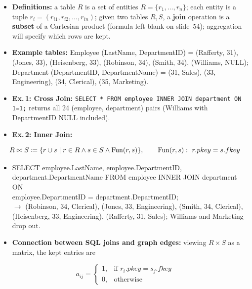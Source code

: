 \begin{itemize}
  \item \textbf{Definitions:} a table $R$ is a set of entities $R=\{r_1,\dots,r_n\}$;
    each entity is a tuple $r_i=(r_{i1},r_{i2},\dots,r_{in})$; given two tables $R,S$, a
    \textbf{join} operation is a \textbf{subset} of a Cartesian product (formula left blank
    on slide~54); aggregation will specify which rows are kept.
  \item \textbf{Example tables:} Employee (LastName, DepartmentID) = (Rafferty, 31),
    (Jones, 33), (Heisenberg, 33), (Robinson, 34), (Smith, 34), (Williams, NULL);
    Department (DepartmentID, DepartmentName) = (31, Sales), (33, Engineering),
    (34, Clerical), (35, Marketing).
  \item \textbf{Ex.\,1: Cross Join:} \texttt{SELECT * FROM employee INNER JOIN department
    ON 1=1;} returns all 24 (employee, department) pairs (Williams with DepartmentID
    NULL included).
  \item \textbf{Ex.\,2: Inner Join:}
\end{itemize}
\begin{equation}\label{eq:lec12-join}
  R\bowtie S\coloneqq\{r\cup s\mid r\in R\wedge s\in S\wedge \mathrm{Fun}(r,s)\},
  \qquad \mathrm{Fun}(r,s):\ r.pkey=s.fkey
\end{equation}
\begin{itemize}
  \item[] {\small\ttfamily SELECT employee.LastName, employee.DepartmentID,\\
    \hspace*{1em}department.DepartmentName FROM employee INNER JOIN department ON\\
    \hspace*{1em}employee.DepartmentID = department.DepartmentID;}\\
    $\to$ (Robinson, 34, Clerical), (Jones, 33, Engineering), (Smith, 34, Clerical),
    (Heisenberg, 33, Engineering), (Rafferty, 31, Sales); Williams and Marketing drop out.
  \item \textbf{Connection between SQL joins and graph edges:} viewing $R\times S$ as a
    matrix, the kept entries are
\end{itemize}
\begin{equation}\label{eq:lec12-adj}
  a_{ij}=\begin{cases}1, & \text{if } r_i.pkey=s_j.fkey\\ 0, & \text{otherwise}\end{cases}
\end{equation}
